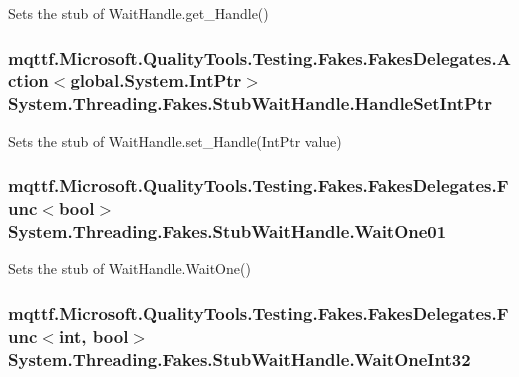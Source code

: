 Sets the stub of Wait\-Handle.\-get\-\_\-\-Handle()

\hypertarget{class_system_1_1_threading_1_1_fakes_1_1_stub_wait_handle_a760dc8518ed42978a6835a2fb62a4bb0}{
\subsubsection[{Handle\-Set\-Int\-Ptr}]{\setlength{\rightskip}{0pt plus 5cm}mqttf.\-Microsoft.\-Quality\-Tools.\-Testing.\-Fakes.\-Fakes\-Delegates.\-Action$<$global.\-System.\-Int\-Ptr$>$ System.\-Threading.\-Fakes.\-Stub\-Wait\-Handle.\-Handle\-Set\-Int\-Ptr}}\label{class_system_1_1_threading_1_1_fakes_1_1_stub_wait_handle_a760dc8518ed42978a6835a2fb62a4bb0}


Sets the stub of Wait\-Handle.\-set\-\_\-\-Handle(\-Int\-Ptr value)

\hypertarget{class_system_1_1_threading_1_1_fakes_1_1_stub_wait_handle_a5424aa528266dc74469e9e1ba117a41b}{
\subsubsection[{Wait\-One01}]{\setlength{\rightskip}{0pt plus 5cm}mqttf.\-Microsoft.\-Quality\-Tools.\-Testing.\-Fakes.\-Fakes\-Delegates.\-Func$<$bool$>$ System.\-Threading.\-Fakes.\-Stub\-Wait\-Handle.\-Wait\-One01}}\label{class_system_1_1_threading_1_1_fakes_1_1_stub_wait_handle_a5424aa528266dc74469e9e1ba117a41b}


Sets the stub of Wait\-Handle.\-Wait\-One()

\hypertarget{class_system_1_1_threading_1_1_fakes_1_1_stub_wait_handle_af951b78398dec40484075ef137f0ca18}{
\subsubsection[{Wait\-One\-Int32}]{\setlength{\rightskip}{0pt plus 5cm}mqttf.\-Microsoft.\-Quality\-Tools.\-Testing.\-Fakes.\-Fakes\-Delegates.\-Func$<$int, bool$>$ System.\-Threading.\-Fakes.\-Stub\-Wait\-Handle.\-Wait\-One\-Int32}}\label{class_system_1_1_threading_1_1_fakes_1_1_stub_wait_handle_af951b78398dec40484075ef137f0ca18}


